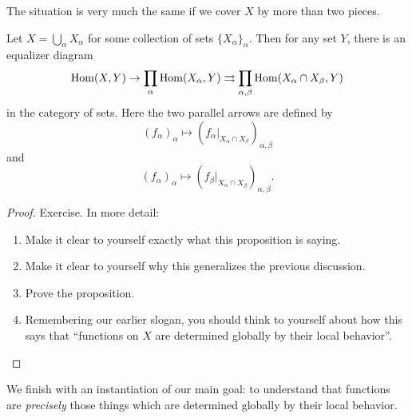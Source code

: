 The situation is very much the same if we cover $X$ by more than two pieces.

\begin{proposition}\label{prop:chap:sheaves:sec:intro:representables are sheaves}
    Let $X = \bigcup_\alpha X_\alpha$ for some collection of sets $\{X_\alpha\}_\alpha$. Then for any set $Y$, there is an equalizer diagram
    \[\operatorname{Hom}(X, Y) \to \prod_\alpha \operatorname{Hom}(X_\alpha, Y) \rightrightarrows \prod_{\alpha, \beta} \operatorname{Hom}(X_\alpha \cap X_\beta, Y)\]
    in the category of sets. Here the two parallel arrows are defined by
    \[(f_\alpha)_\alpha \mapsto (f_\alpha |_{X_\alpha \cap X_\beta})_{\alpha,\beta}\]
    and
    \[(f_\alpha)_\alpha \mapsto (f_\beta |_{X_\alpha \cap X_\beta})_{\alpha,\beta}.\]
\end{proposition}
\begin{proof}
    Exercise. In more detail:
    \begin{enumerate}
        \item Make it clear to yourself exactly what this proposition is saying.
        \item Make it clear to yourself why this generalizes the previous discussion.
        \item Prove the proposition.
        \item Remembering our earlier slogan, you should think to yourself about how this says that ``functions on $X$ are determined globally by their local behavior''.
    \end{enumerate}
\end{proof}

We finish with an instantiation of our main goal: to understand that functions are \emph{precisely} those things which are determined globally by their local behavior.

